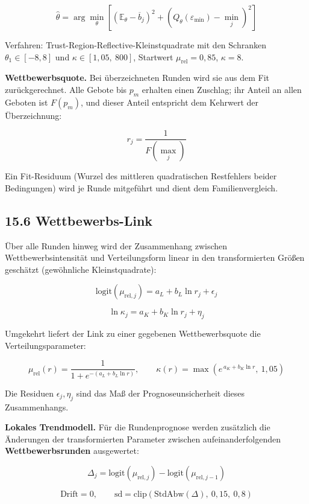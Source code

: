 \documentclass[
  a4paper,
  10pt]{article}
\begin{document}
\[ \hat{\theta} = \arg\min_{\theta} \left[ \left(\mathbb{E}_\theta - \overline{b}_j\right)^2 + \left(Q_\theta(\varepsilon_{\min}) - \min_j\right)^2 \right] \]

Verfahren: Trust-Region-Reflective-Kleinstquadrate mit den Schranken
\(\theta_1 \in [-8, 8]\) und \(\kappa \in [1{,}05,\ 800]\), Startwert
\(\mu_{\mathrm{rel}} = 0{,}85\), \(\kappa = 8\).

\textbf{Wettbewerbsquote.} Bei überzeichneten Runden wird sie aus dem
Fit zurückgerechnet. Alle Gebote bis \(p_m\) erhalten einen Zuschlag;
ihr Anteil an allen Geboten ist \(F(p_m)\), und dieser Anteil entspricht
dem Kehrwert der Überzeichnung:

\[ r_j = \frac{1}{F\left(\max_j\right)} \]

Ein Fit-Residuum (Wurzel des mittleren quadratischen Restfehlers beider
Bedingungen) wird je Runde mitgeführt und dient dem Familienvergleich.

\hypertarget{wettbewerbs-link}{%
\subsection{15.6 Wettbewerbs-Link}\label{wettbewerbs-link}}

Über alle Runden hinweg wird der Zusammenhang zwischen
Wettbewerbsintensität und Verteilungsform linear in den transformierten
Größen geschätzt (gewöhnliche Kleinstquadrate):

\[ \mathrm{logit}\left(\mu_{\mathrm{rel},j}\right) = a_L + b_L \ln r_j + \epsilon_j \]

\[ \ln \kappa_j = a_K + b_K \ln r_j + \eta_j \]

Umgekehrt liefert der Link zu einer gegebenen Wettbewerbsquote die
Verteilungsparameter:

\[ \mu_{\mathrm{rel}}(r) = \frac{1}{1 + e^{-\left(a_L + b_L \ln r\right)}}, \qquad \kappa(r) = \max\left(e^{\,a_K + b_K \ln r},\ 1{,}05\right) \]

Die Residuen \(\epsilon_j, \eta_j\) sind das Maß der
Prognoseunsicherheit dieses Zusammenhangs.

\textbf{Lokales Trendmodell.} Für die Rundenprognose werden zusätzlich
die Änderungen der transformierten Parameter zwischen
aufeinanderfolgenden \textbf{Wettbewerbsrunden} ausgewertet:

\[ \Delta_j = \mathrm{logit}\left(\mu_{\mathrm{rel},j}\right) - \mathrm{logit}\left(\mu_{\mathrm{rel},j-1}\right) \]

\[ \mathrm{Drift} = 0, \qquad \mathrm{sd} = \mathrm{clip}\left(\mathrm{StdAbw}\left(\Delta\right),\ 0{,}15,\ 0{,}8\right) \]
\end{document}
